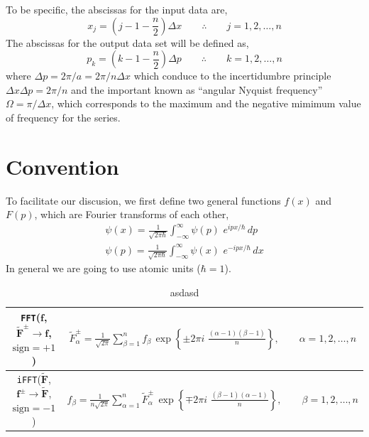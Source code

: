 \clearpage
To be specific, the abscissas for the input data are,
\begin{equation}
x_j = \left(j-1-\frac{n}{2}\right)\Delta x \qquad\therefore\qquad j=1,2,\ldots,n
\end{equation}
The abscissas for the output data set will be defined as,
\begin{equation}
p_k = \left(k-1-\frac{n}{2}\right)\Delta p \qquad\therefore\qquad k=1,2,\ldots,n
\end{equation}
where $\Delta p = 2\pi/a = 2\pi/n\Delta x$ which conduce to the incertidumbre principle $\Delta x \Delta p = 2\pi/n$ and the important known as
``angular Nyquist frequency'' $\Omega=\pi/\Delta x$, which corresponds to the maximum and the negative mimimum value of frequency for the series.


\section{Convention}

To facilitate our discusion, we first define two general functions $f(x)$ and $F(p)$, which are
Fourier transforms of each other,
\begin{equation}
\begin{gathered}
\psi(x) = \frac{1}{\sqrt{2\pi\hbar}}\int_{-\infty}^{\infty} \psi(p)\,\, e^{ipx/\hbar}\,dp
\\
\psi(p) = \frac{1}{\sqrt{2\pi\hbar}}\int_{-\infty}^{\infty} \psi(x)\,\, e^{-ipx/\hbar}\,dx
\end{gathered}
\end{equation}
In general we are going to use atomic units ($\hbar=1$).

\begin{table}[h!]
\centering
\begin{tabular}{|c|c|}
\hline
\texttt{FFT}($\mathbf{f}$, $\tilde{\mathbf{F}}^\pm\rightarrow\mathbf{f}$, $\text{sign}=+1$) &
${\displaystyle
\tilde{F}_\alpha^\pm =
\frac{1}{\sqrt{2\pi}}\sum_{\beta=1}^{n} f_\beta\,\exp\left\{\pm 2\pi i\,\,\frac{(\alpha-1)(\beta-1)}{n}\right\}, \qquad \alpha = 1, 2, \ldots, n
}$
\\\hline
\texttt{iFFT}($\mathbf{\tilde{F}}$, $\mathbf{f}^\pm\rightarrow\mathbf{\tilde{F}}$, $\text{sign}=-1$) &
${\displaystyle
f_\beta =
\frac{1}{n\sqrt{2\pi}}\sum_{\alpha=1}^{n} \tilde{F}_\alpha^\pm\,\exp\left\{\mp 2\pi i\,\,\frac{(\beta-1)(\alpha-1)}{n}\right\}, \qquad \beta = 1, 2, \ldots, n
}$
\\\hline
\end{tabular}
\caption{\footnotesize{
asdasd
}}
\label{table: fft transforms}
\end{table}


